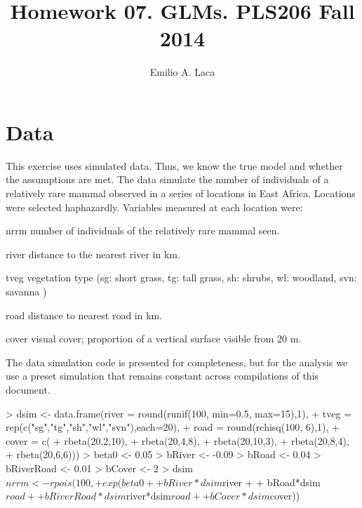 \documentclass{article}
\begin{document}


\title{Homework 07. GLMs. PLS206 Fall 2014}
\author{Emilio A. Laca}
\maketitle

\section{Data}

This exercise uses simulated data. Thus, we know the true model and whether the assumptions are met. The data simulate the number of individuals of a relatively rare mammal observed in a series of locations in East Africa. Locations were selected haphazardly. Variables measured at each location were:

\begin{description*}
  \item[nrrm] number of individuals of the relatively rare mammal seen.
  \item[river] distance to the nearest river in km.
  \item[tveg] vegetation type (sg: short grass, tg: tall grass, sh: shrubs, wl: woodland, svn: savanna )
  \item[road] distance to nearest road in km.
  \item[cover] visual cover; proportion of a vertical surface visible from 20 m.
\end{description*}

The data simulation code is presented for completeness, but for the analysis we use a preset simulation that remains constant across compilations of this document.
\begin{Schunk}
\begin{Sinput}
> dsim <- data.frame(river = round(runif(100, min=0.5, max=15),1),
+                  tveg = rep(c("sg","tg","sh","wl","svn"),each=20),
+                  road = round(rchisq(100, 6),1),
+                  cover = c(
+                    rbeta(20,2,10),
+                    rbeta(20,4,8),
+                    rbeta(20,10,3),
+                    rbeta(20,8,4),
+                    rbeta(20,6,6)))
> beta0 <- 0.05
> bRiver <- -0.09
> bRoad <- 0.04
> bRiverRoad <- 0.01
> bCover <- 2
> dsim$nrrm <- rpois(100,
+                  exp(beta0 +
+                      bRiver*dsim$river +
+                      bRoad*dsim$road +
+                      bRiverRoad*dsim$river*dsim$road +
+                      bCover*dsim$cover))
\end{Sinput}
\end{Schunk}
\end{document}
